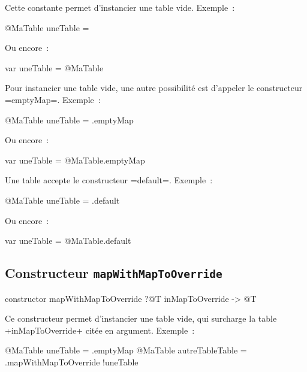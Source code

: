 
Cette constante permet d'instancier une table vide. Exemple~:
\begin{galgas3}
@MaTable uneTable = {}
\end{galgas3}

Ou encore~:

\begin{galgas3}
var uneTable = @MaTable {}
\end{galgas3}


Pour instancier une table vide, une autre possibilité est d'appeler le constructeur \ggst=emptyMap=. Exemple~:
\begin{galgas3}
@MaTable uneTable = .emptyMap
\end{galgas3}

Ou encore~:

\begin{galgas3}
var uneTable = @MaTable.emptyMap
\end{galgas3}





Une table accepte le constructeur \ggst=default=. Exemple~:
\begin{galgas3}
@MaTable uneTable = .default
\end{galgas3}

Ou encore~:

\begin{galgas3}
var uneTable = @MaTable.default
\end{galgas3}



\subsection{Constructeur \texttt{mapWithMapToOverride}}

\begin{galgas3}
constructor mapWithMapToOverride ?@T inMapToOverride -> @T
\end{galgas3}

Ce constructeur permet d'instancier une table vide, qui surcharge la table \ggst+inMapToOverride+ citée en argument. Exemple~:
\begin{galgas3}
@MaTable uneTable = .emptyMap
@MaTable autreTableTable = .mapWithMapToOverride {!uneTable}
\end{galgas3}






